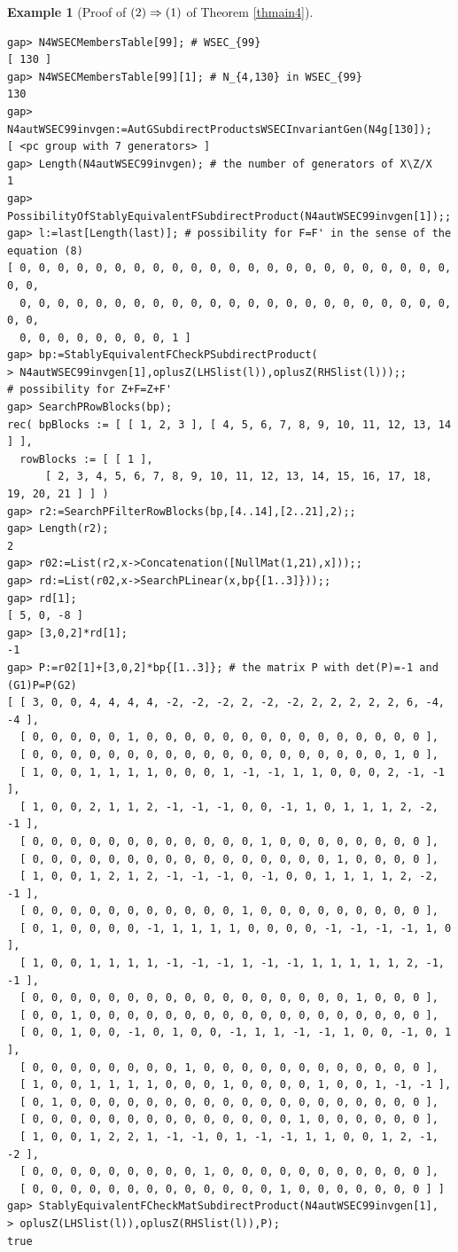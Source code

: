\documentclass{amsart}
\theoremstyle{plain}
\theoremstyle{definition}
\newtheorem{example}[theorem]{Example}
\theoremstyle{remark}
\begin{document}
\begin{example}[Proof of ${\rm (2)}\Rightarrow {\rm (1)}$ of {Theorem \ref{thmain4}}]
\begin{verbatim}
gap> N4WSECMembersTable[99]; # WSEC_{99}
[ 130 ]
gap> N4WSECMembersTable[99][1]; # N_{4,130} in WSEC_{99}
130
gap> N4autWSEC99invgen:=AutGSubdirectProductsWSECInvariantGen(N4g[130]);
[ <pc group with 7 generators> ]
gap> Length(N4autWSEC99invgen); # the number of generators of X\Z/X
1
gap> PossibilityOfStablyEquivalentFSubdirectProduct(N4autWSEC99invgen[1]);;
gap> l:=last[Length(last)]; # possibility for F=F' in the sense of the equation (8)
[ 0, 0, 0, 0, 0, 0, 0, 0, 0, 0, 0, 0, 0, 0, 0, 0, 0, 0, 0, 0, 0, 0, 0, 0, 0, 
  0, 0, 0, 0, 0, 0, 0, 0, 0, 0, 0, 0, 0, 0, 0, 0, 0, 0, 0, 0, 0, 0, 0, 0, 0, 
  0, 0, 0, 0, 0, 0, 0, 0, 1 ]
gap> bp:=StablyEquivalentFCheckPSubdirectProduct(
> N4autWSEC99invgen[1],oplusZ(LHSlist(l)),oplusZ(RHSlist(l)));;
# possibility for Z+F=Z+F'
gap> SearchPRowBlocks(bp);
rec( bpBlocks := [ [ 1, 2, 3 ], [ 4, 5, 6, 7, 8, 9, 10, 11, 12, 13, 14 ] ], 
  rowBlocks := [ [ 1 ], 
      [ 2, 3, 4, 5, 6, 7, 8, 9, 10, 11, 12, 13, 14, 15, 16, 17, 18, 19, 20, 21 ] ] )
gap> r2:=SearchPFilterRowBlocks(bp,[4..14],[2..21],2);;
gap> Length(r2);
2
gap> r02:=List(r2,x->Concatenation([NullMat(1,21),x]));;
gap> rd:=List(r02,x->SearchPLinear(x,bp{[1..3]}));;
gap> rd[1];
[ 5, 0, -8 ]
gap> [3,0,2]*rd[1];
-1
gap> P:=r02[1]+[3,0,2]*bp{[1..3]}; # the matrix P with det(P)=-1 and (G1)P=P(G2)
[ [ 3, 0, 0, 4, 4, 4, 4, -2, -2, -2, 2, -2, -2, 2, 2, 2, 2, 2, 6, -4, -4 ], 
  [ 0, 0, 0, 0, 0, 1, 0, 0, 0, 0, 0, 0, 0, 0, 0, 0, 0, 0, 0, 0, 0 ], 
  [ 0, 0, 0, 0, 0, 0, 0, 0, 0, 0, 0, 0, 0, 0, 0, 0, 0, 0, 0, 1, 0 ], 
  [ 1, 0, 0, 1, 1, 1, 1, 0, 0, 0, 1, -1, -1, 1, 1, 0, 0, 0, 2, -1, -1 ], 
  [ 1, 0, 0, 2, 1, 1, 2, -1, -1, -1, 0, 0, -1, 1, 0, 1, 1, 1, 2, -2, -1 ], 
  [ 0, 0, 0, 0, 0, 0, 0, 0, 0, 0, 0, 0, 1, 0, 0, 0, 0, 0, 0, 0, 0 ], 
  [ 0, 0, 0, 0, 0, 0, 0, 0, 0, 0, 0, 0, 0, 0, 0, 0, 1, 0, 0, 0, 0 ], 
  [ 1, 0, 0, 1, 2, 1, 2, -1, -1, -1, 0, -1, 0, 0, 1, 1, 1, 1, 2, -2, -1 ], 
  [ 0, 0, 0, 0, 0, 0, 0, 0, 0, 0, 0, 1, 0, 0, 0, 0, 0, 0, 0, 0, 0 ], 
  [ 0, 1, 0, 0, 0, 0, -1, 1, 1, 1, 1, 0, 0, 0, 0, -1, -1, -1, -1, 1, 0 ], 
  [ 1, 0, 0, 1, 1, 1, 1, -1, -1, -1, 1, -1, -1, 1, 1, 1, 1, 1, 2, -1, -1 ], 
  [ 0, 0, 0, 0, 0, 0, 0, 0, 0, 0, 0, 0, 0, 0, 0, 0, 0, 1, 0, 0, 0 ], 
  [ 0, 0, 1, 0, 0, 0, 0, 0, 0, 0, 0, 0, 0, 0, 0, 0, 0, 0, 0, 0, 0 ], 
  [ 0, 0, 1, 0, 0, -1, 0, 1, 0, 0, -1, 1, 1, -1, -1, 1, 0, 0, -1, 0, 1 ], 
  [ 0, 0, 0, 0, 0, 0, 0, 0, 1, 0, 0, 0, 0, 0, 0, 0, 0, 0, 0, 0, 0 ], 
  [ 1, 0, 0, 1, 1, 1, 1, 0, 0, 0, 1, 0, 0, 0, 0, 1, 0, 0, 1, -1, -1 ], 
  [ 0, 1, 0, 0, 0, 0, 0, 0, 0, 0, 0, 0, 0, 0, 0, 0, 0, 0, 0, 0, 0 ], 
  [ 0, 0, 0, 0, 0, 0, 0, 0, 0, 0, 0, 0, 0, 0, 1, 0, 0, 0, 0, 0, 0 ], 
  [ 1, 0, 0, 1, 2, 2, 1, -1, -1, 0, 1, -1, -1, 1, 1, 0, 0, 1, 2, -1, -2 ], 
  [ 0, 0, 0, 0, 0, 0, 0, 0, 0, 1, 0, 0, 0, 0, 0, 0, 0, 0, 0, 0, 0 ], 
  [ 0, 0, 0, 0, 0, 0, 0, 0, 0, 0, 0, 0, 0, 1, 0, 0, 0, 0, 0, 0, 0 ] ]
gap> StablyEquivalentFCheckMatSubdirectProduct(N4autWSEC99invgen[1],
> oplusZ(LHSlist(l)),oplusZ(RHSlist(l)),P);
true


\end{verbatim}
\end{example}
\end{document}
